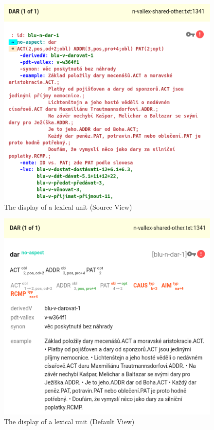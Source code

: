 \documentclass[10pt, a4paper]{article}
\begin{document}
\begin{figure}
    \includegraphics[width=\hsize]{images/ui-lexical-unit-src.png}
    \caption{\label{fig:ui-lexical-unit-src}The display of a lexical unit (Source View)}
\end{figure}

\begin{figure}
    \includegraphics[width=\hsize]{images/ui-lexical-unit.png}
    \caption{\label{fig:ui-lexical-unit}The display of a lexical unit (Default View)}
\end{figure}
\end{document}
